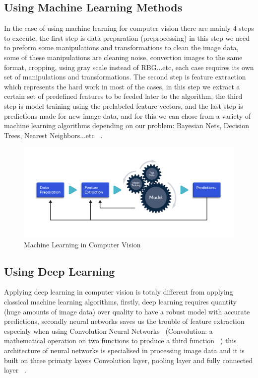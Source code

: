     \subsection{Using Machine Learning Methods}
        In the case of using machine learning for computer vision there are mainly 4 steps to execute, the first step is data preparation (preprocessing) in this step we need to preform some manipulations and transformations to clean the image data, some of these manipulations are cleaning noise, convertion images to the same format, cropping, using gray scale instead of RBG...etc, each case requires its own set of manipulations and transformations. The second step is feature extraction which represents the hard work in most of the cases, in this step we extract a certain set of predefined features to be feeded later to the algorithm, the third step is model training using the prelabeled feature vectors, and the last step is predictions made for new image data, and for this we can chose from a variety of machine learning algorithms depending on our problem: Bayesian Nets, Decision Trees, Nearest Neighbors...etc ~\cite{mldlcv}.
        \begin{figure}[htbp]
        \begin{center}
        \includegraphics[width=12cm]{./chapter-02-general-ai-information/machine-learning-cv.png}
        \end{center}
        \caption{Machine Learning in Computer Vision ~\cite{mldlcv}}
        \label{fig:mldlcv}
        \end{figure}
    \subsection{Using Deep Learning} 
        Applying deep learning in computer vision is totaly different from applying classical machine learning algorithms, firstly,  deep learning requires quantity (huge amounts of image data) over quality to have a robust model with accurate predictions, secondly neural networks saves us the trouble of feature extraction especialy when using Convolution Neural Networks ~\cite{machine-learning-full-scale}(Convolution: a mathematical operation on two functions to produce a third function ~\cite{machine-learning-ibm}) this architecture of neural networks is specialised in processing image data and it is built on three primaty layers Convolution layer, pooling layer and fully connected layer  ~\cite{mldlcv}.


